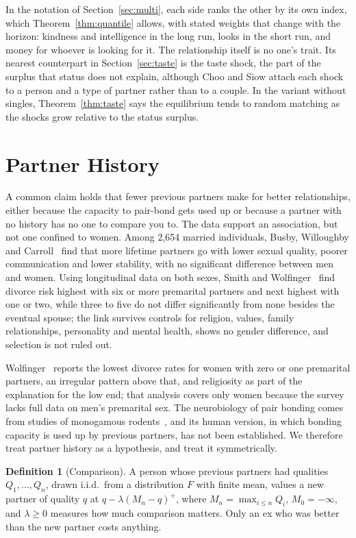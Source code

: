 \documentclass[11pt]{article}
\let\oldsection\section
\renewcommand{\section}{\Needspace{0.25\textheight}\oldsection}
\theoremstyle{definition}
\newtheorem{definition}[theorem]{Definition}
\theoremstyle{remark}
\begin{document}
In the notation of Section~\ref{sec:multi}, each side ranks the other by
its own index, which Theorem~\ref{thm:quantile} allows, with stated
weights that change with the horizon: kindness and intelligence in the
long run, looks in the short run, and money for whoever is looking for
it. The relationship itself is no one's trait. Its nearest counterpart
in Section~\ref{sec:taste} is the taste shock, the part of the surplus
that status does not explain, although Choo and Siow attach each shock
to a person and a type of partner rather than to a couple. In the
variant without singles, Theorem~\ref{thm:taste} says the equilibrium
tends to random matching as the shocks grow relative to the status
surplus.

\section{Partner History}\label{sec:history}

A common claim holds that fewer previous partners make for better
relationships, either because the capacity to pair-bond gets used up or
because a partner with no history has no one to compare you to. The data
support an association, but not one confined to women. Among 2,654
married individuals, Busby, Willoughby and Carroll~\cite{busby} find
that more lifetime partners go with lower sexual quality, poorer
communication and lower stability, with no significant difference
between men and women. Using longitudinal data on both sexes, Smith and
Wolfinger~\cite{smith} find divorce risk highest with six or more
premarital partners and next highest with one or two, while three to
five do not differ significantly from none besides the eventual spouse;
the link survives controls for religion, values, family relationships,
personality and mental health, shows no gender difference, and
selection is not ruled out.

Wolfinger~\cite{wolfinger} reports the lowest divorce rates for women
with zero or one premarital partners, an irregular pattern above that,
and religiosity as part of the explanation for the low end; that
analysis covers only women because the survey lacks full data on men's
premarital sex. The neurobiology of pair bonding comes from studies of
monogamous rodents~\cite{young}, and its human version, in which bonding
capacity is used up by previous partners, has not been established. We
therefore treat partner history as a hypothesis, and treat it
symmetrically.

\begin{definition}[Comparison]\label{def:comparison}
  A person whose previous partners had qualities $Q_1,\dots,Q_n$, drawn
  i.i.d.\ from a distribution $F$ with finite mean, values a new partner
  of quality $q$ at $q - \lambda(M_n-q)^+$, where $M_n = \max_{i\le n}
  Q_i$, $M_0 = -\infty$, and $\lambda\ge0$ measures how much comparison
  matters. Only an ex who was better than the new partner costs
  anything.
\end{definition}
\end{document}
